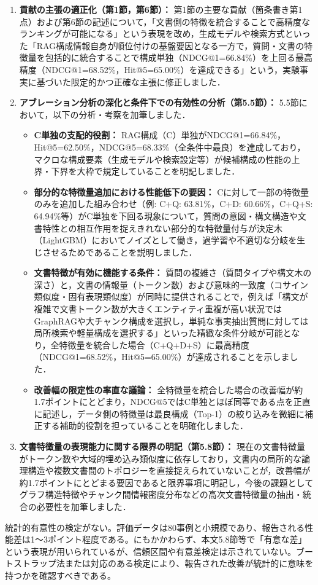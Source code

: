 \documentclass{jsarticle}
\begin{document}
\begin{enumerate}
\item \textbf{貢献の主張の適正化（第1節，第6節）：}
第1節の主要な貢献（箇条書き第1点）および第6節の記述について，「文書側の特徴を統合することで高精度なランキングが可能になる」という表現を改め，生成モデルや検索方式といった「RAG構成情報自身が順位付けの基盤要因となる一方で，質問・文書の特徴量を包括的に統合することで構成単独（NDCG@1=66.84\%）を上回る最高精度（NDCG@1=68.52\%，Hit@5=65.00\%）を達成できる」という，実験事実に基づいた限定的かつ正確な主張に修正しました．

\item \textbf{アブレーション分析の深化と条件下での有効性の分析（第5.5節）：}
5.5節において，以下の分析・考察を加筆しました．
\begin{itemize}
\item \textbf{C単独の支配的役割：} RAG構成（C）単独がNDCG@1=66.84\%，Hit@5=62.50\%，NDCG@5=68.33\%（全条件中最良）を達成しており，マクロな構成要素（生成モデルや検索設定等）が候補構成の性能の上界・下界を大枠で規定していることを明記しました．
\item \textbf{部分的な特徴量追加における性能低下の要因：} Cに対して一部の特徴量のみを追加した組み合わせ（例: C+Q: 63.81\%，C+D: 60.66\%，C+Q+S: 64.94\%等）がC単独を下回る現象について，質問の意図・構文構造や文書特性との相互作用を捉えきれない部分的な特徴量付与が決定木（LightGBM）においてノイズとして働き，過学習や不適切な分岐を生じさせるためであることを説明しました．
\item \textbf{文書特徴が有効に機能する条件：} 質問の複雑さ（質問タイプや構文木の深さ）と，文書の情報量（トークン数）および意味的一致度（コサイン類似度・固有表現類似度）が同時に提供されることで，例えば「構文が複雑で文書トークン数が大きくエンティティ重複が高い状況ではGraphRAGや大チャンク構成を選択し，単純な事実抽出質問に対しては局所検索や軽量構成を選択する」といった精緻な条件分岐が可能となり，全特徴量を統合した場合（C+Q+D+S）に最高精度（NDCG@1=68.52\%，Hit@5=65.00\%）が達成されることを示しました．
\item \textbf{改善幅の限定性の率直な議論：} 全特徴量を統合した場合の改善幅が約1.7ポイントにとどまり，NDCG@5ではC単独とほぼ同等である点を正直に記述し，データ側の特徴量は最良構成（Top-1）の絞り込みを微細に補正する補助的役割を担っていることを明確化しました．
\end{itemize}

\item \textbf{文書特徴量の表現能力に関する限界の明記（第5.8節）：}
現在の文書特徴量がトークン数や大域的埋め込み類似度に依存しており，文書内の局所的な論理構造や複数文書間のトポロジーを直接捉えられていないことが，改善幅が約1.7ポイントにとどまる要因であると限界事項に明記し，今後の課題としてグラフ構造特徴やチャンク間情報密度分布などの高次文書特徴量の抽出・統合の必要性を加筆しました．
\end{enumerate}
\begin{screen}
統計的有意性の検定がない。評価データは80事例と小規模であり、報告される性能差は1〜3ポイント程度である。にもかかわらず、本文5.8節等で「有意な差」という表現が用いられているが、信頼区間や有意差検定は示されていない。ブートストラップ法または対応のある検定により、報告された改善が統計的に意味を持つかを確認すべきである。
\end{screen}
\end{document}
